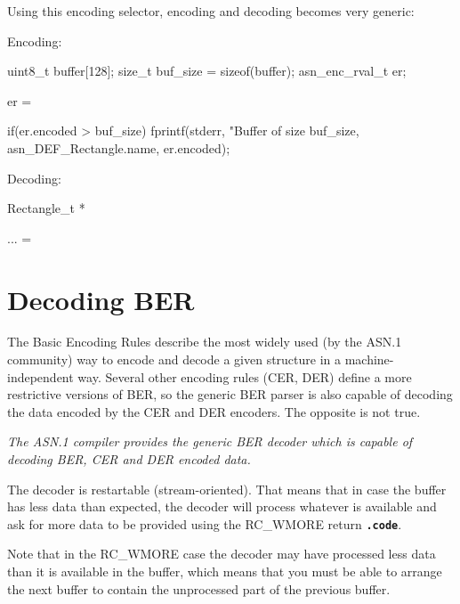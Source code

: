 \documentclass[english,oneside,12pt]{book}
\newcommand{\code}[1]{\texttt{\textbf{\lstinline{#1}}}}
\begin{document}
Using this encoding selector, encoding and decoding becomes very generic:

\noindent{}Encoding:

\begin{codesample}[basicstyle=\scriptsize\listingfont]
uint8_t buffer[128];
size_t buf_size = sizeof(buffer);
asn_enc_rval_t er;

er = %

if(er.encoded > buf_size) {
    fprintf(stderr, "Buffer of size %
        buf_size, asn_DEF_Rectangle.name, er.encoded);
}
\end{codesample}

\noindent{}Decoding:

\begin{codesample}[basicstyle=\scriptsize\listingfont]
Rectangle_t *%

... = %
\end{codesample}

\section{\label{sec:Decoding-BER}Decoding BER}

The Basic Encoding Rules describe the most widely used (by the ASN.1
community) way to encode and decode a given structure in a machine-independent
way. Several other encoding rules (CER, DER) define a more restrictive
versions of BER, so the generic BER parser is also capable of decoding
the data encoded by the CER and DER encoders. The opposite is not true.

\emph{The ASN.1 compiler provides the generic BER decoder which is
capable of decoding BER, CER and DER encoded data.}

The decoder is restartable (stream-oriented).
That means that in case the buffer has less data than expected,
the decoder will process whatever is available and ask for more data
to be provided using the RC\_WMORE return \code{.code}.

Note that in the RC\_WMORE case the decoder may have processed less data than
it is available in the buffer, which means that you must be able to arrange
the next buffer to contain the unprocessed part of the previous buffer.
\end{document}
